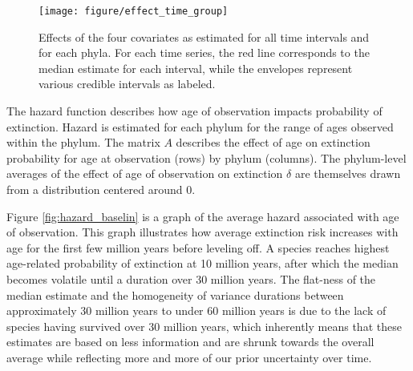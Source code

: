 \documentclass[12pt,letterpaper]{article}
\begin{document}
\begin{figure}[ht]
  \centering
  \texttt{[image: figure/effect\_time\_group]}
  \caption{Effects of the four covariates as estimated for all time intervals and for each phyla. For each time series, the red line corresponds to the median estimate for each interval, while the envelopes represent various credible intervals as labeled.}
  \label{fig:effect_time_group}
\end{figure}



The hazard function describes how age of observation impacts probability of extinction. Hazard is estimated for each phylum for the range of ages observed within the phylum. The matrix \(A\) describes the effect of age on extinction probability for age at observation (rows) by phylum (columns). The phylum-level averages of the effect of age of observation on extinction \(\delta\) are themselves drawn from a distribution centered around 0.


Figure \ref{fig:hazard_baselin} is a graph of the average hazard associated with age of observation. This graph illustrates how average extinction risk increases with age for the first few million years before leveling off. A species reaches highest age-related probability of extinction at 10 million years, after which the median becomes volatile until a duration over 30 million years. The flat-ness of the median estimate and the homogeneity of variance durations between approximately 30 million years to under 60 million years is due to the lack of species having survived over 30 million years, which inherently means that these estimates are based on less information and are shrunk towards the overall average while reflecting more and more of our prior uncertainty over time. 
\end{document}
